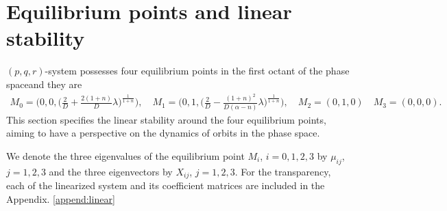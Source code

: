 \documentclass[a4paper,11pt]{article}
\begin{document}
\section{Equilibrium points and linear stability} \label{sec:equil}
$(p,q,r)$-system possesses four equilibrium points in the first octant of the phase space\footnotemark[1] and they are
\begin{align*}
 M_0=\Big(0,0,\big(\frac{2}{D} + \frac{2(1+n)}{D} \lambda\big)^{\frac{1}{1+n}}\Big), \quad M_1=\Big(0,1,\big(\frac{2}{D} -\frac{(1+n)^2}{D(\alpha-n)} \lambda\big)^{\frac{1}{1+n}}\Big), \quad  M_2=(0,1,0) \quad M_3 = (0,0,0).
\end{align*}
This section specifies the linear stability around the four equilibrium points, aiming to have a perspective on the dynamics of orbits in the phase space.

We denote the three eigenvalues of the equilibrium point $M_i$, $i=0,1,2,3$ by $\mu_{ij}$, $j=1,2,3$ and the three eigenvectors by $X_{ij}$, $j=1,2,3$. For the transparency, each of the linearized system and its coefficient matrices are included in the Appendix. \ref{append:linear} \medskip
\end{document}
